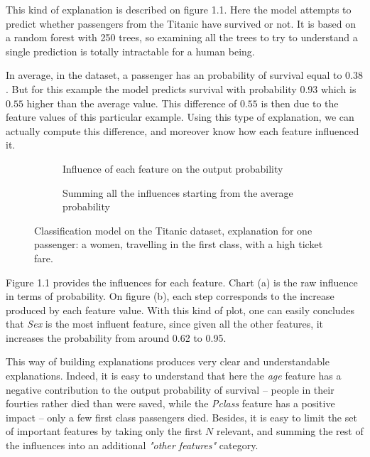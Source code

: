 \documentclass[a4paper,11pt]{kth-mag}
\begin{document}
This kind of explanation is described on figure 1.1. Here the model attempts to predict whether passengers from the Titanic have survived or not. It is based on a random forest with 250 trees, so examining all the trees to try to understand a single prediction is totally intractable for a human being.

In average, in the dataset, a passenger has an probability of survival equal to $0.38$. But for this example the model predicts survival with probability $0.93$ which is $0.55$ higher than the average value. This difference of $0.55$ is then due to the feature values of this particular example. Using this type of explanation, we can actually compute this difference, and moreover know how each feature influenced it. 

\begin{figure}[h!]
	\begin{subfigure}{1.\textwidth}
    	\centering
    	\def\svgwidth{\columnwidth}
    	
    	\caption{Influence of each feature on the output probability}
    \end{subfigure}
	\begin{subfigure}{1.\textwidth}
    	\centering
    	\def\svgwidth{\columnwidth}
    	
    	\caption{Summing all the influences starting from the average probability}
    \end{subfigure}
    \caption{Classification model on the Titanic dataset, explanation for one passenger: a women, travelling in the first class, with a high ticket fare.}
\end{figure}

Figure 1.1 provides the influences for each feature. Chart (a) is the raw influence in terms of probability. On figure (b), each step corresponds to the increase produced by each feature value. With this kind of plot, one can easily concludes that \textit{Sex} is the most influent feature, since given all the other features, it increases the probability from around 0.62 to 0.95.

This way of building explanations produces very clear and understandable explanations. Indeed, it is easy to understand that here the \textit{age} feature has a negative contribution to the output probability of survival -- people in their fourties rather died than were saved, while the \textit{Pclass} feature has a positive impact -- only a few first class passengers died. Besides, it is easy to limit the set of important features by taking only the first $N$ relevant, and summing the rest of the influences into an additional \textit{"other features"} category.
\end{document}
